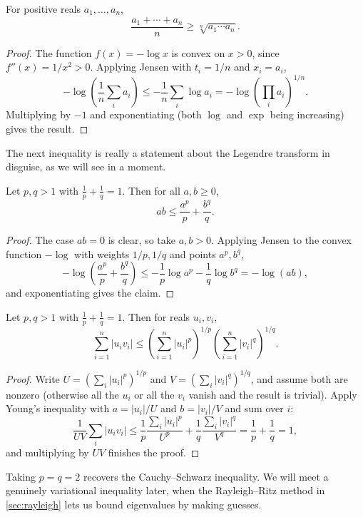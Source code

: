 \documentclass[a4paper]{scrartcl}
\begin{document}
\begin{corollary}[AM--GM Inequality]
	For positive reals $a_1, \dots, a_n$,
	$$
	\frac{a_1 + \cdots + a_n}{n} \geq \sqrt[n]{a_1 \cdots a_n}.
	$$
\end{corollary}
\begin{proof}
	The function $f(x) = -\log x$ is convex on $x > 0$, since $f''(x) = 1/x^2 > 0$. Applying Jensen with $t_i = 1/n$ and $x_i = a_i$,
	$$
	-\log\left(\frac{1}{n}\sum_i a_i\right) \leq -\frac{1}{n}\sum_i \log a_i = -\log\left(\prod_i a_i\right)^{1/n}.
	$$
	Multiplying by $-1$ and exponentiating (both $\log$ and $\exp$ being increasing) gives the result.
\end{proof}

The next inequality is really a statement about the Legendre transform in disguise, as we will see in a moment.

\begin{proposition}
	Let $p, q > 1$ with $\frac{1}{p} + \frac{1}{q} = 1$. Then for all $a, b \geq 0$,
	$$
	ab \leq \frac{a^p}{p} + \frac{b^q}{q}.
	$$
\end{proposition}
\begin{proof}
	The case $ab = 0$ is clear, so take $a, b > 0$. Applying Jensen to the convex function $-\log$ with weights $1/p, 1/q$ and points $a^p, b^q$,
	$$
	-\log\left(\frac{a^p}{p} + \frac{b^q}{q}\right) \leq -\frac{1}{p}\log a^p - \frac{1}{q}\log b^q = -\log(ab),
	$$
	and exponentiating gives the claim.
\end{proof}

\begin{corollary}
	Let $p, q > 1$ with $\frac 1p + \frac 1q = 1$. Then for reals $u_i, v_i$,
	$$
	\sum_{i=1}^n |u_i v_i| \leq \left(\sum_{i=1}^n |u_i|^p\right)^{1/p}\left(\sum_{i=1}^n |v_i|^q\right)^{1/q}.
	$$
\end{corollary}
\begin{proof}
	Write $U = (\sum_i |u_i|^p)^{1/p}$ and $V = (\sum_i |v_i|^q)^{1/q}$, and assume both are nonzero (otherwise all the $u_i$ or all the $v_i$ vanish and the result is trivial). Apply Young's inequality with $a = |u_i|/U$ and $b = |v_i|/V$ and sum over $i$:
	$$
	\frac{1}{UV}\sum_i |u_iv_i| \leq \frac{1}{p}\frac{\sum_i |u_i|^p}{U^p} + \frac{1}{q}\frac{\sum_i|v_i|^q}{V^q} = \frac{1}{p} + \frac{1}{q} = 1,
	$$
	and multiplying by $UV$ finishes the proof.
\end{proof}

Taking $p = q = 2$ recovers the Cauchy--Schwarz inequality. We will meet a genuinely variational inequality later, when the Rayleigh--Ritz method in \autoref{sec:rayleigh} lets us bound eigenvalues by making guesses.
\end{document}
